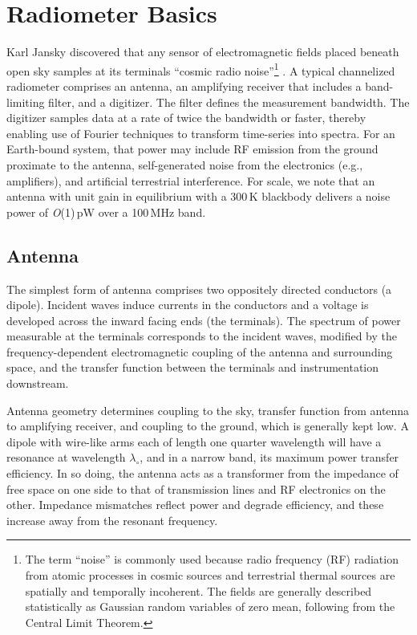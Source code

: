 
\section{Radiometer Basics}

Karl Jansky discovered that any sensor of electromagnetic fields placed beneath open sky samples at its terminals ``cosmic radio noise''\footnote{The term ``noise'' is commonly used because radio frequency (RF) radiation from atomic processes in cosmic sources and terrestrial thermal sources are spatially and temporally incoherent.  The fields are generally described statistically as Gaussian random variables of zero mean, following from the Central Limit Theorem.}  \cite{jansky33}.  A typical channelized radiometer comprises an antenna, an amplifying receiver that includes a band-limiting filter, and a digitizer.  The filter defines the measurement bandwidth.   The digitizer samples data at a rate of twice the bandwidth or faster, thereby enabling use of Fourier techniques to transform time-series into spectra. For an Earth-bound system, that power may include RF emission from the ground proximate to the antenna,  self-generated noise from the electronics (e.g., amplifiers), and artificial terrestrial interference.  For scale, we note that an antenna with unit gain in equilibrium with a 300\,K blackbody delivers a noise power of {\it O}(1)\,pW over a 100\,MHz band.


\subsection{Antenna}
  
The simplest form of antenna comprises two oppositely directed conductors (a dipole).  Incident waves induce currents in the conductors and a voltage is developed across the inward facing ends (the terminals). The spectrum of power measurable at the terminals corresponds to the incident waves, modified by the frequency-dependent electromagnetic coupling of the antenna and surrounding space, and the transfer function between the terminals and instrumentation downstream.
  
Antenna geometry determines coupling to the sky, transfer function from antenna to amplifying receiver, and coupling to the ground, which is generally kept low.  A dipole with wire-like arms each of length one quarter wavelength will have a resonance at wavelength $\lambda_\circ$, and in a narrow band, its maximum power transfer efficiency.  In so doing, the antenna acts as a transformer from the impedance of free space on one side to that of transmission lines and RF electronics on the other.  Impedance mismatches reflect power and degrade efficiency, and these increase away from the resonant frequency.
  
